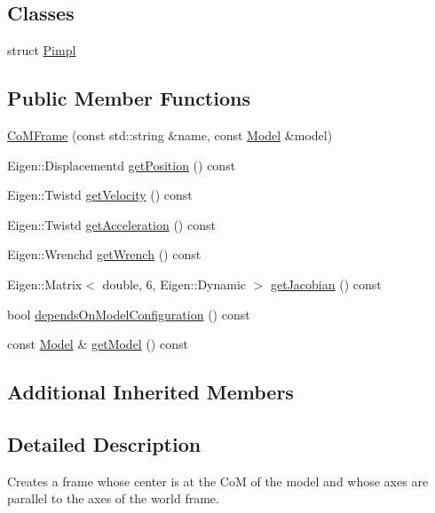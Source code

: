 \subsection*{Classes}
\begin{DoxyCompactItemize}
\item 
struct \hyperlink{structocra_1_1CoMFrame_1_1Pimpl}{Pimpl}
\end{DoxyCompactItemize}
\subsection*{Public Member Functions}
\begin{DoxyCompactItemize}
\item 
\hyperlink{classocra_1_1CoMFrame_a0b9177034d13b851238da7edfadcdf38}{Co\+M\+Frame} (const std\+::string \&name, const \hyperlink{classocra_1_1Model}{Model} \&model)
\item 
Eigen\+::\+Displacementd \hyperlink{classocra_1_1CoMFrame_a809c05664b2e2abb489e930e27fbe2d4}{get\+Position} () const
\item 
Eigen\+::\+Twistd \hyperlink{classocra_1_1CoMFrame_a02be3e73c64903d67b1e7ada25c468c5}{get\+Velocity} () const
\item 
Eigen\+::\+Twistd \hyperlink{classocra_1_1CoMFrame_a9e59ca65720c553da5c75f484544829c}{get\+Acceleration} () const
\item 
Eigen\+::\+Wrenchd \hyperlink{classocra_1_1CoMFrame_a8e00462bbe13df6f595b7000d44240c6}{get\+Wrench} () const
\item 
Eigen\+::\+Matrix$<$ double, 6, Eigen\+::\+Dynamic $>$ \hyperlink{classocra_1_1CoMFrame_ab24f3400af3e8eb2a12d6597ff8a7a31}{get\+Jacobian} () const
\item 
bool \hyperlink{classocra_1_1CoMFrame_aaae3fd05da2f9e301dbe1c54b57fe624}{depends\+On\+Model\+Configuration} () const
\item 
const \hyperlink{classocra_1_1Model}{Model} \& \hyperlink{classocra_1_1CoMFrame_afc280df9814e7eb2cf62f017f7bbfc2e}{get\+Model} () const
\end{DoxyCompactItemize}
\subsection*{Additional Inherited Members}


\subsection{Detailed Description}
Creates a frame whose center is at the CoM of the model and whose axes are parallel to the axes of the world frame. 

